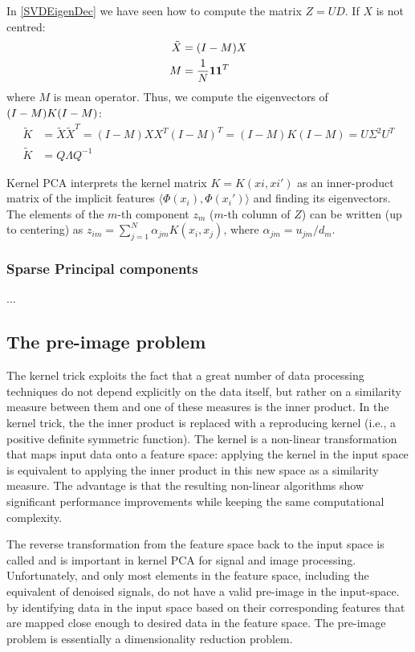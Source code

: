 In \autoref{SVDEigenDec} we have seen how to compute the matrix $Z=UD$.
If $X$ is not centred:
\begin{equation}
\begin{aligned}
\tilde{X} &= \br{I - M}X\\
M &= \frac{1}{N}\mathbf{1}\mathbf{1}^T
\end{aligned}
\end{equation}
where $M$ is mean operator. Thus, we compute the eigenvectors of $\br{I-M}K\br{I-M}$:
\begin{equation}
\begin{aligned}
\tilde{K} &= \tilde{X}\tilde{X}^T = (I-M)XX^T(I-M)^T = (I-M)K(I-M) = U\Sigma^2U^T\\
\tilde{K} &= Q\Lambda Q^{-1}
\end{aligned}
\end{equation}

Kernel PCA interprets the kernel matrix $K = {K(xi,xi')}$ as an inner-product matrix of the implicit features $\langle\Phi(x_i ), \Phi(x_i')\rangle$ and finding its eigenvectors. 
The elements of the $m$-th component $z_m$ ($m$-th column of $Z$) can be written (up to centering) as $z_{im} = \sum^N_{j=1} \alpha_{jm}K(x_i, x_j )$, where $\alpha_{jm} = u_{jm}/d_m$.

\subsubsection{Sparse Principal components}
...
\subsection{The pre-image problem}
The kernel trick exploits the fact that a great number of data processing techniques do not depend explicitly on the data itself, but rather on a similarity measure between them and one of these measures is the inner product. In the kernel trick, the the inner product is replaced with a reproducing kernel (i.e.,  a positive definite symmetric function). The kernel is a non-linear transformation that maps input data onto a feature space: applying the kernel in the input space is equivalent to applying the inner product in this new space as a similarity measure. The advantage is that the resulting non-linear algorithms show significant performance improvements while keeping the same computational complexity.

The reverse transformation from the feature space back to the input space is called  and is important in kernel PCA for signal and image processing. Unfortunately,  and only most elements in the feature space, including the equivalent of denoised signals, do not have a valid pre-image in the input-space.  by identifying data in the input space based on their corresponding features that are mapped close enough to desired data in the feature space. The pre-image problem is essentially a dimensionality reduction problem.

